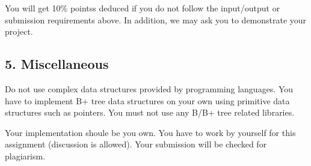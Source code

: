 You will get 10\% pointss deduced if you do not follow the input/output or submission requirements above. In addition, we may ask you to demonstrate your project.

\subsection*{5. Miscellaneous}


\begin{DoxyItemize}
\item Do not use complex data structures provided by programming languages. You have to implement B+ tree data structures on your own using primitive data structures such as pointers. You must not use any B/\+B+ tree related libraries.
\item Your implementation shoule be you own. You have to work by yourself for this assignment (discussion is allowed). Your submission will be checked for plagiarism. 
\end{DoxyItemize}